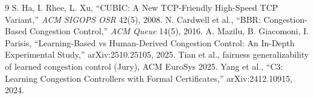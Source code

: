 \documentclass[10pt,twocolumn]{article}
\begin{document}
\small
\begin{thebibliography}{9}
 S. Ha, I. Rhee, L. Xu, ``CUBIC: A New TCP-Friendly High-Speed TCP Variant,'' \emph{ACM SIGOPS OSR} 42(5), 2008.
 N. Cardwell et al., ``BBR: Congestion-Based Congestion Control,'' \emph{ACM Queue} 14(5), 2016.
 A. Mazilu, B. Giacomoni, I. Parisis, ``Learning-Based vs Human-Derived Congestion Control: An In-Depth Experimental Study,'' arXiv:2510.25105, 2025.
 Tian et al., fairness generalizability of learned congestion control (Jury), ACM EuroSys 2025. %
 Yang et al., ``C3: Learning Congestion Controllers with Formal Certificates,'' arXiv:2412.10915, 2024.
\end{thebibliography}
\end{document}
